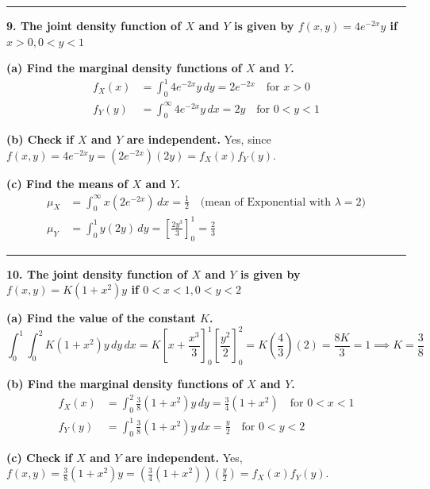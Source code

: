 \documentclass{article}
\begin{document}
\vspace{1em}
\hrule
\vspace{1em}

\textbf{9. The joint density function of $X$ and $Y$ is given by $f(x, y) = 4e^{-2x}y$ if $x > 0, 0 < y < 1$}

\textbf{(a) Find the marginal density functions of $X$ and $Y$.}
\begin{align*}
f_X(x) &= \int_{0}^{1} 4e^{-2x}y \,dy = 2e^{-2x} \quad \text{for } x > 0 \\
f_Y(y) &= \int_{0}^{\infty} 4e^{-2x}y \,dx = 2y \quad \text{for } 0 < y < 1
\end{align*}

\textbf{(b) Check if $X$ and $Y$ are independent.}
Yes, since $f(x,y) = 4e^{-2x}y = (2e^{-2x})(2y) = f_X(x)f_Y(y)$.

\textbf{(c) Find the means of $X$ and $Y$.}
\begin{align*}
\mu_X &= \int_{0}^{\infty} x(2e^{-2x}) \,dx = \frac{1}{2} \quad \text{(mean of Exponential with } \lambda=2) \\
\mu_Y &= \int_{0}^{1} y(2y) \,dy = \left[ \frac{2y^3}{3} \right]_0^1 = \frac{2}{3}
\end{align*}

\vspace{1em}
\hrule
\vspace{1em}

\textbf{10. The joint density function of $X$ and $Y$ is given by $f(x,y) = K(1+x^2)y$ if $0 < x < 1, 0 < y < 2$}

\textbf{(a) Find the value of the constant $K$.}
$$\int_{0}^{1} \int_{0}^{2} K(1+x^2)y \,dy \,dx = K \left[x + \frac{x^3}{3}\right]_0^1 \left[\frac{y^2}{2}\right]_0^2 = K\left(\frac{4}{3}\right)(2) = \frac{8K}{3} = 1 \implies K = \frac{3}{8}$$

\textbf{(b) Find the marginal density functions of $X$ and $Y$.}
\begin{align*}
f_X(x) &= \int_{0}^{2} \frac{3}{8}(1+x^2)y \,dy = \frac{3}{4}(1+x^2) \quad \text{for } 0 < x < 1 \\
f_Y(y) &= \int_{0}^{1} \frac{3}{8}(1+x^2)y \,dx = \frac{y}{2} \quad \text{for } 0 < y < 2
\end{align*}

\textbf{(c) Check if $X$ and $Y$ are independent.}
Yes, $f(x,y) = \frac{3}{8}(1+x^2)y = \left( \frac{3}{4}(1+x^2) \right) \left( \frac{y}{2} \right) = f_X(x)f_Y(y)$.
\end{document}
